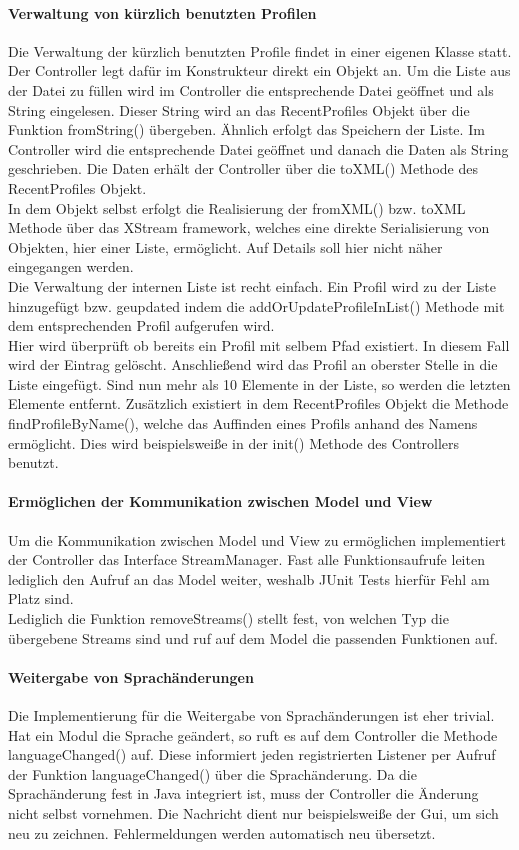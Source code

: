 \paragraph{Verwaltung von kürzlich benutzten Profilen}
Die Verwaltung der kürzlich benutzten Profile findet in einer eigenen Klasse statt. Der Controller legt dafür im Konstrukteur direkt ein Objekt an. Um die Liste aus der Datei zu füllen wird im Controller die
entsprechende Datei geöffnet und als String eingelesen. Dieser String wird an das RecentProfiles Objekt über die Funktion fromString() übergeben. Ähnlich erfolgt das Speichern der Liste.
Im Controller wird die entsprechende Datei geöffnet und danach die Daten als String geschrieben. Die Daten erhält der Controller über die toXML() Methode des RecentProfiles Objekt.\\
In dem Objekt selbst erfolgt die Realisierung der fromXML() bzw. toXML Methode über das XStream framework, welches eine direkte Serialisierung von Objekten, hier einer Liste, ermöglicht. Auf Details soll hier nicht näher eingegangen werden.\\
Die Verwaltung der internen Liste ist recht einfach. Ein Profil wird zu der Liste hinzugefügt bzw. geupdated indem die addOrUpdateProfileInList() Methode mit dem entsprechenden Profil aufgerufen wird.\\
Hier wird überprüft ob bereits ein Profil mit selbem Pfad existiert. In diesem Fall wird der Eintrag gelöscht. Anschließend wird das Profil an oberster Stelle in die Liste eingefügt. Sind nun mehr als 10
Elemente in der Liste, so werden die letzten Elemente entfernt. Zusätzlich existiert in dem RecentProfiles Objekt die Methode findProfileByName(), welche das Auffinden eines Profils anhand des Namens ermöglicht. Dies wird beispielsweiße in der init() Methode des Controllers benutzt.

\paragraph{Ermöglichen der Kommunikation zwischen Model und View}
Um die Kommunikation zwischen Model und View zu ermöglichen implementiert der Controller das Interface StreamManager. Fast alle Funktionsaufrufe leiten lediglich den Aufruf an das Model weiter, weshalb JUnit Tests hierfür Fehl am Platz sind.\\
Lediglich die Funktion removeStreams() stellt fest, von welchen Typ die übergebene Streams sind und ruf auf dem Model die passenden Funktionen auf.
\paragraph{Weitergabe von Sprachänderungen}
Die Implementierung für die Weitergabe von Sprachänderungen ist eher trivial. Hat ein Modul die Sprache geändert, so ruft es auf dem Controller die Methode languageChanged() auf.
Diese informiert jeden registrierten Listener per Aufruf der Funktion languageChanged() über die Sprachänderung. Da die Sprachänderung fest in Java integriert ist, muss der Controller die Änderung nicht selbst vornehmen. Die Nachricht dient
nur beispielsweiße der Gui, um sich neu zu zeichnen. Fehlermeldungen werden automatisch neu übersetzt.
